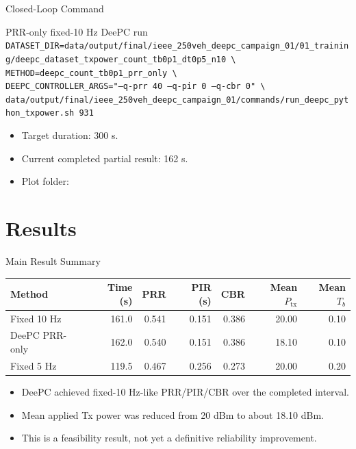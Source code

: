 \documentclass[aspectratio=1610,10pt]{beamer}
\newcommand{\tx}{P_{\mathrm{tx}}}
\newcommand{\smallpath}[1]{\scriptsize\texttt{\detokenize{#1}}}
\begin{document}
\begin{frame}{Closed-Loop Command}
  \scriptsize
  \begin{block}{PRR-only fixed-10 Hz DeePC run}
  \texttt{DATASET\_DIR=data/output/final/ieee\_250veh\_deepc\_campaign\_01/01\_training/deepc\_dataset\_txpower\_count\_tb0p1\_dt0p5\_n10 \textbackslash}\\
  \texttt{METHOD=deepc\_count\_tb0p1\_prr\_only \textbackslash}\\
  \texttt{DEEPC\_CONTROLLER\_ARGS="--q-prr 40 --q-pir 0 --q-cbr 0" \textbackslash}\\
  \texttt{data/output/final/ieee\_250veh\_deepc\_campaign\_01/commands/run\_deepc\_python\_txpower.sh 931}
  \end{block}

  \vspace{0.5em}
  \begin{itemize}
    \item Target duration: 300 s.
    \item Current completed partial result: 162 s.
    \item Plot folder: \smallpath{run_931/plots}
  \end{itemize}
\end{frame}

\section{Results}

\begin{frame}{Main Result Summary}
  \begin{table}
    \centering
    \scriptsize
    \begin{tabular}{lrrrrrr}
      \toprule
      Method & Time (s) & PRR & PIR (s) & CBR & Mean $\tx$ & Mean $T_b$ \\
      \midrule
      Fixed 10 Hz & 161.0 & 0.541 & 0.151 & 0.386 & 20.00 & 0.10 \\
      DeePC PRR-only & 162.0 & 0.540 & 0.151 & 0.386 & 18.10 & 0.10 \\
      Fixed 5 Hz & 119.5 & 0.467 & 0.256 & 0.273 & 20.00 & 0.20 \\
      \bottomrule
    \end{tabular}
  \end{table}

  \vspace{0.5em}
  \begin{itemize}
    \item DeePC achieved fixed-10 Hz-like PRR/PIR/CBR over the completed interval.
    \item Mean applied Tx power was reduced from 20 dBm to about 18.10 dBm.
    \item This is a feasibility result, not yet a definitive reliability improvement.
  \end{itemize}
\end{frame}
\end{document}
